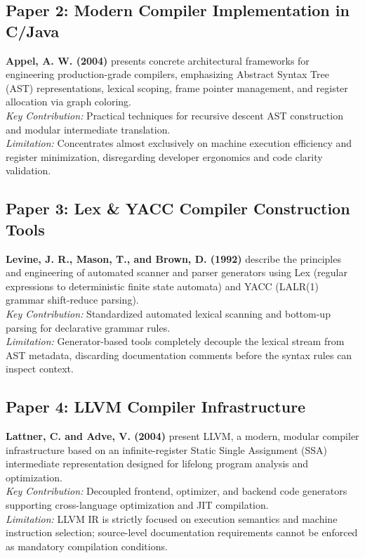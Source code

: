 \subsection{Paper 2: Modern Compiler Implementation in C/Java}
\textbf{Appel, A. W. (2004)} \cite{appel2004modern} presents concrete architectural frameworks for engineering production-grade compilers, emphasizing Abstract Syntax Tree (AST) representations, lexical scoping, frame pointer management, and register allocation via graph coloring. \\
\textit{Key Contribution:} Practical techniques for recursive descent AST construction and modular intermediate translation. \\
\textit{Limitation:} Concentrates almost exclusively on machine execution efficiency and register minimization, disregarding developer ergonomics and code clarity validation.

\subsection{Paper 3: Lex \& YACC Compiler Construction Tools}
\textbf{Levine, J. R., Mason, T., and Brown, D. (1992)} \cite{levine1992lex} describe the principles and engineering of automated scanner and parser generators using Lex (regular expressions to deterministic finite state automata) and YACC (LALR(1) grammar shift-reduce parsing). \\
\textit{Key Contribution:} Standardized automated lexical scanning and bottom-up parsing for declarative grammar rules. \\
\textit{Limitation:} Generator-based tools completely decouple the lexical stream from AST metadata, discarding documentation comments before the syntax rules can inspect context.

\subsection{Paper 4: LLVM Compiler Infrastructure}
\textbf{Lattner, C. and Adve, V. (2004)} \cite{lattner2004llvm} present LLVM, a modern, modular compiler infrastructure based on an infinite-register Static Single Assignment (SSA) intermediate representation designed for lifelong program analysis and optimization. \\
\textit{Key Contribution:} Decoupled frontend, optimizer, and backend code generators supporting cross-language optimization and JIT compilation. \\
\textit{Limitation:} LLVM IR is strictly focused on execution semantics and machine instruction selection; source-level documentation requirements cannot be enforced as mandatory compilation conditions.

